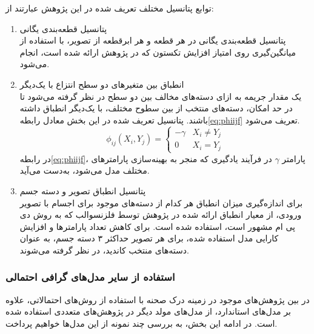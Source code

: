 توابع پتانسیل مختلف تعریف شده در این پژوهش عبارتند از:

\begin{enumerate}
\item پتانسیل قطعه‌بندی یگانی\\
پتانسیل قطعه‌بندی یگانی در هر قطعه و هر ابرقطعه از تصویر، با استفاده از میانگین‌گیری روی امتیاز افزایش تکستون که در پژوهش \cite{ladicky2010graph} ارائه شده است، انجام می‌شود.
\item انطباق بین متغیرهای دو سطح انتزاع با یک‌دیگر\\
یک مقدار جریمه به ازای دسته‌های مخالف بین دو سطح در نظر گرفته‌ می‌شود تا در حد امکان، دسته‌های منتخب از بین سطوح مختلف، با یک‌دیگر انطباق داشته باشند. پتانسیل تعریف شده در این بخش معادل رابطه\ref{eq:phiijf} 
تعریف می‌شود.
	\begin{equation}
		\phi_{ij}(X_i, Y_j)=
			\left\{
				\begin{array}{ll}
					- \gamma		&	X_i \neq Y_j \\
					0			&	X_i	=	Y_j
				\end{array}							
			\right.
		\label{eq:phiijf}
	\end{equation}
در رابطه\ref{eq:phiijf}، پارامتر $\gamma$ در فرآیند یادگیری که منجر به بهینه‌سازی پارامترهای مختلف مدل می‌شود، به‌دست می‌آید.
\item پتانسیل انطباق تصویر و دسته جسم\\
برای اندازه‌گیری میزان انطباق هر کدام از دسته‌های موجود برای اجسام با تصویر ورودی، از معیار انطباق ارائه شده در پژوهش\cite{felzenszwalb2010object}
 توسط فلزنسوالب که به روش دی پی ام مشهور است، استفاده شده است. برای کاهش تعداد پارامترها و افزایش کارایی مدل استفاده شده، برای هر تصویر حداکثر ۳ دسته جسم، به عنوان دسته‌های منتخب کاندید، در نظر گرفته می‌شوند.
\end{enumerate}


\subsubsection{استفاده از سایر مدل‌های گرافی احتمالی}
در بین پژوهش‌های موجود در زمینه درک صحنه با استفاده از روش‌های احتمالاتی، علاوه بر مدل‌های استاندارد، از مدل‌های مولد دیگر در پژوهش‌های متعددی استفاده شده است. در ادامه این بخش، به بررسی چند‌ نمونه از این مدل‌ها خواهیم پرداخت.

